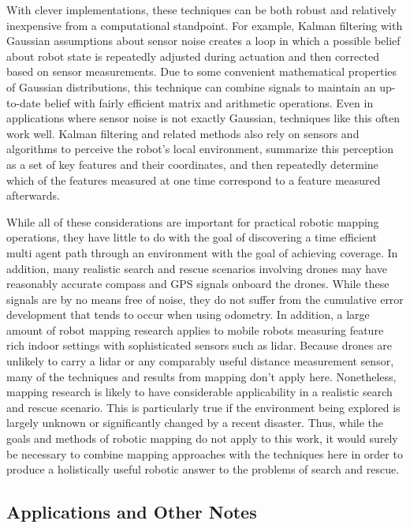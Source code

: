 With clever implementations, these techniques can be both robust and relatively inexpensive from a computational standpoint. For example, Kalman filtering with Gaussian assumptions about sensor noise creates a loop in which a possible belief about robot state is repeatedly adjusted during actuation and then corrected based on sensor measurements. Due to some convenient mathematical properties of Gaussian distributions, this technique can combine signals to maintain an up-to-date belief with fairly efficient matrix and arithmetic operations. Even in applications where sensor noise is not exactly Gaussian, techniques like this often work well. Kalman filtering and related methods also rely on sensors and algorithms to perceive the robot's local environment, summarize this perception as a set of key features and their coordinates, and then repeatedly determine which of the features measured at one time correspond to a feature measured afterwards.


While all of these considerations are important for practical robotic mapping operations, they have little to do with the goal of discovering a time efficient multi agent path through an environment with the goal of achieving coverage. In addition, many realistic search and rescue scenarios involving drones may have reasonably accurate compass and GPS signals onboard the drones. While these signals are by no means free of noise, they do not suffer from the cumulative error development that tends to occur when using odometry. In addition, a large amount of robot mapping research applies to mobile robots measuring feature rich indoor settings with sophisticated sensors such as lidar. Because drones are unlikely to carry a lidar or any comparably useful distance measurement sensor, many of the techniques and results from mapping don't apply here. Nonetheless, mapping research is likely to have considerable applicability in a realistic search and rescue scenario. This is particularly true if the environment being explored is largely unknown or significantly changed by a recent disaster. Thus, while the goals and methods of robotic mapping do not apply to this work, it would surely be necessary to combine mapping approaches with the techniques here in order to produce a holistically useful robotic answer to the problems of search and rescue.

\subsection{Applications and Other Notes}

